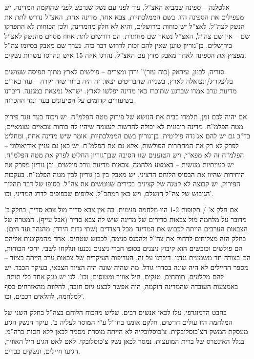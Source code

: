 \documentclass[]{../../../../tex/classes/styledArticle}
\begin{document}
	אלטלנה – ספינה שמביא האצ''ל, עוד לפני עם נשק שנרכש לפני שהוקמה המדינה. יש מעפילים את הספינה הזו. בשם הממלכתיות, צבא אחד, מדינה אחת, האצ''ל נדרש לתת את הנשק לצה''ל. לאצ''ל יש כוחות בירושלים, והיא לא חלק מהמדינה, ולכן הכוחות לא התפרקו שם – אין שם צה''ל, האצ''ל נשאר שם מחתרת. הם דורשים לתת אחוז מסוים מהנשק לאצ''ל בירושלים. בן־גוריון טוען שאין להם זכות לדרוש דבר כזה. נערך שם מאבק בסיומו צה''ל מפציץ את הספינה לאחר מאבק מזוין עם האצ''ל, נהרגו איזה 15 איש ונהרסו עשרות נשקים. 
	
	סוריה, לבנון, עיראק (כוח עזר)'' ירדן ומצרים – פולשים לארץ מתוך תפיסה שעושים בליצקריג/ונצואלה לארץ, בשנייה שהבריטים יצאו. זה היה ברור שזה יקרה – עוד באו''ם מדינות ערב אמרו שברגע שתוכרז כאן מדינה יפלשו לארץ. ישראל נמצאת במגננה. דיברנו בשיעורים קדומים על הטיעונים בעד ונגד ההכרזה. 
	
	אם יהיה לכם זמן, תלמדו בבית את הנושא של פירוק מטה הפלמ''ח. יש ויכוח בעד ונגד פירוק מטה הפלמ''ח. מדינה ריבונית לא יכולה להרשות לעצמה שיהיו לה כוחות צבאיים עצמאיים, בד''כ גם יש להם אג'נדה פוליטית. בן־גוריון בשם הממלכתיות, אומר שיש מדינה אחת, ומחליט לפרק לא רק את המחתרות הפולשות, אלא גם את הפלמ''ח. יש כאן גם עניין אידיאולוגי – הפלמ''ח זה לא מפא''י, ויש הטוענים שזו הסיבה שבן־גוריון החליט לפרק את מטה הפלמ''ח. יש בעייתיות מעשית – באמצע מלחמה, צבאות מדינות ערב פולשים, ובן גוריון מפרק את היחידות שהיוו את הבסיס הלוחם הרציני. יש מאבק בין בן־גוריון לבין מטה הפלמ''ח. בעקבות הפירוק, יש קבוצה לא קטנה של קצינים בכירים שנוטשים את צה''ל. בסופו של דבר תהליך הגיבוש של צה''ל הושלם, ויש כאן רמתכ''ל, אלופים שכפופים לדרג המדיני, וכו'. 
	
	אם חלק א' / תקופות 1-2 היו מלחמה פנימית, בה אין צבא סדיר מול צבא סדיר, בחלק ב' מדובר על מלחמה מול צבאות סדירים של מדינה שיש לה צבא סדיר (אבל עייף). המטרה של הצבאות הערבים הייתה לכבוש את המדינה מכל הצדדים (שתי גדות הירדן, מהנהר ועד הים). בחלק הזה מצליחים לדחוק את צה''ל ולהכנס פנימה, לכבוש שטחים. אחד מהמקומות אליהם הם פולשים וכובשים הוא קיבוץ ניצנים בסופו חברי ניצנים נכנעו ונלקחו לשבי. יחסי הכוחות, הם בצורה חד־משמעית נגדנו. דיברנו על זה, העדיפות העיקרית של צבאות ערב הייתה בציוד – מספר החיילים לא היה שונה בסדרי גודל. מה שהיה שונה היה הציוד הצבאי, בעיקר הכבד. יש להם מקלעים, תותחים, טנקים, חיל אוויר ומטוסים, וכו'. לנו יש טנק אחד בלי תותח. באמצעות העובדה שהמדינה הוקמה, היה אפשר לבצע גיוס חובה, להלוות מהאזרחים כסף למלחמה, להלאים רכבים, וכו'. 
	
	בהבט הדמוגרפי, עלו לכאן אנשים רבים. שליש מהכוח הלוחם בצה''ל בחלק השני של המלחמה היו עולים חדשים, חלקם אומנו בחו''ל ע''י המוסד לעליה ב'. עיקר הנשק הגיע מעסקת המשק הצ'כוסלובקית. צ'כוסלובקיה לא הייתה מוסרת מסמר לכאן ללא חסות ברה''מ. בגלל האינטרס של ברית המועצות, נמסר לכאן נשק צ'כוסלובקי. לאט לאט הגיע חיל האוויר, הגיעו חיילים, ונשקים כבדים. 
	
\end{document}
